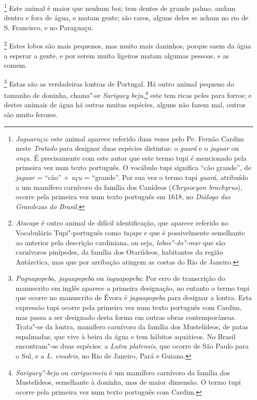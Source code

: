 \footnote{ \textit{Jaguaruçu}: este animal
aparece referido duas vezes pelo Pe. Fernão Cardim neste
\textit{Tratado} para designar duas espécies distintas: o \textit{guará}
e o \textit{jaguar} ou \textit{onça.} É precisamente com este autor
que este termo tupi é mencionado pela primeira vez num texto português.
O vocábulo tupi significa ``cão grande'', de \textit{jaguar} = ``cão'' +
\textit{uçu} = ``grande''. Por sua vez o termo tupi \textit{guará}, 
atribuído a um mamífero carnívoro da família dos Canídeos
(\textit{Chrysocyon brachyrus}), ocorre pela primeira vez num texto
português em 1618, no \textit{Diálogo das Grandezas do Brasil.}}
 Este animal é maior que nenhum boi; tem dentes de grande
palmo, andam dentro e fora de água, e matam gente; são raros, alguns
deles se acham no rio de S. Francisco, e no Paraguaçu.

\footnote{ \textit{Atacape} é outro animal de
difícil identificação, que aparece referido no Vocabulário
Tupi"-português como \textit{taçape} e que é possivelmente semelhante ao
anterior pela descrição cardiniana, ou seja, \textit{lobos"-do"-mar} que
são carnívoros pinípedes, da família dos Otariídeos, habitantes da
região Antárctica, mas que por arribação atingem as costas do Rio de
Janeiro.} Estes lobos são mais pequenos, mas muito mais
daninhos, porque saem da água a esperar a gente, e por serem muito
ligeiros matam algumas pessoas, e as comem.

\footnote{ \textit{Pagnapopeba, jaguapopeba} ou
\textit{iaguapopeba}: Por erro de transcrição do manuscrito em inglês
aparece a primeira designação, no entanto o termo tupi que ocorre no
manuscrito de Évora é \textit{jaguapopeba} para designar a lontra. Esta
expressão tupi ocorre pela primeira vez num texto português com Cardim,
mas passa a ser designado desta forma em outras obras contemporâneas.
Trata"-se da lontra, mamífero carnívoro da família dos Mustelídeos, de
patas espalmadas, que vive à beira da água e tem hábitos aquáticos. No
Brasil encontram"-se duas espécies: a \textit{Lutra platensis}, que
ocorre de São Paulo para o Sul, e a \textit{L. enudris}, no Rio de
Janeiro, Pará e Guiana.} Estas são as verdadeiras
lontras de Portugal. Há outro animal pequeno do tamanho de doninha,
chama"-se \textit{Sariguey beju},\footnote{ \textit{Sariguey"-beju} ou
\textit{cariguemeiu} é um mamífero carnívoro da família dos
Mustelídeos, semelhante à doninha, mas de maior dimensão. O termo tupi
ocorre pela primeira vez num texto português com Cardim.} este tem
ricas peles para forros; e destes animais de água há outras muitas
espécies, alguns não fazem mal, outros são muito ferozes.

